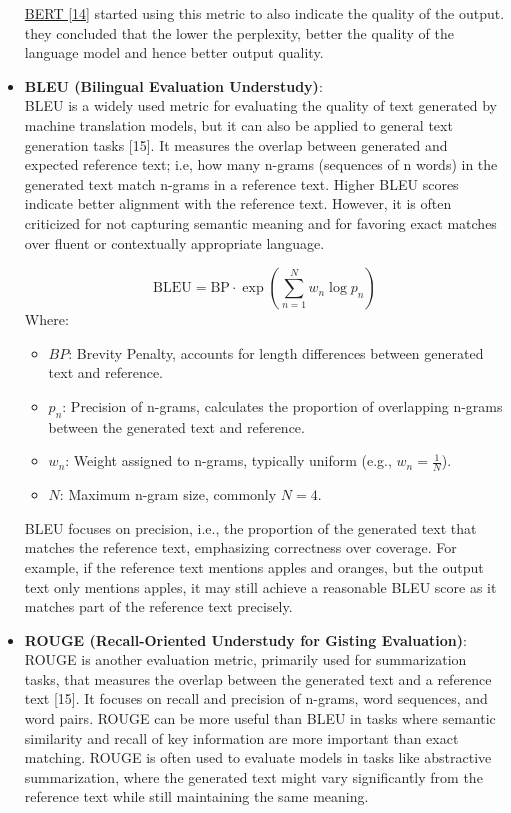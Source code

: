 \documentclass[12pt]{article}
\begin{document}
\begin{itemize}
        \href{https://arxiv.org/pdf/1810.04805}{BERT [14]} started using this metric to also indicate the quality of the output. they concluded that the lower the perplexity, better the quality of the language model and hence better output quality.


        \item \textbf{BLEU (Bilingual Evaluation Understudy)}: \\
        BLEU is a widely used metric for evaluating the quality of text generated by machine translation models, but it can also be applied to general text generation tasks [15]. It measures the overlap between generated and expected reference text; i.e, how many n-grams (sequences of n words) in the generated text match n-grams in a reference text. Higher BLEU scores indicate better alignment with the reference text. However, it is often criticized for not capturing semantic meaning and for favoring exact matches over fluent or contextually appropriate language.

        \[
            \text{BLEU} = \text{BP} \cdot \exp\left( \sum_{n=1}^{N} w_n \log p_n \right)
        \]
        Where:
        \begin{itemize}
            \item \(BP\): Brevity Penalty, accounts for length differences between generated text and reference.
            \item \(p_n\): Precision of n-grams, calculates the proportion of overlapping n-grams between the generated text and reference.
            \item \(w_n\): Weight assigned to n-grams, typically uniform (e.g., \(w_n = \frac{1}{N}\)).
            \item \(N\): Maximum n-gram size, commonly \(N = 4\).
        \end{itemize}

        BLEU focuses on precision, i.e., the proportion of the generated text that matches the reference text, emphasizing correctness over coverage. For example, if the reference text mentions apples and oranges, but the output text only mentions apples, it may still achieve a reasonable BLEU score as it matches part of the reference text precisely.

        \item \textbf{ROUGE (Recall-Oriented Understudy for Gisting Evaluation)}: \\
        ROUGE is another evaluation metric, primarily used for summarization tasks, that measures the overlap between the generated text and a reference text [15]. It focuses on recall and precision of n-grams, word sequences, and word pairs. ROUGE can be more useful than BLEU in tasks where semantic similarity and recall of key information are more important than exact matching. ROUGE is often used to evaluate models in tasks like abstractive summarization, where the generated text might vary significantly from the reference text while still maintaining the same meaning.



\end{itemize}
\end{document}
